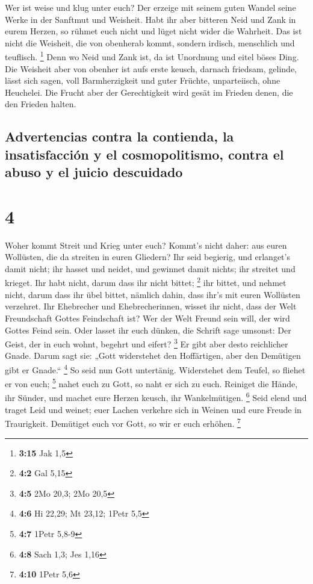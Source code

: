  Wer ist weise und klug unter euch? Der erzeige mit
seinem guten Wandel seine Werke in der Sanftmut und Weisheit.
 Habt ihr aber bitteren Neid und Zank in eurem Herzen, so
rühmet euch nicht und lüget nicht wider die Wahrheit. 
Das ist nicht die Weisheit, die von obenherab kommt, sondern irdisch,
menschlich und teuflisch. \footnote{\textbf{3:15} Jak 1,5}
 Denn wo Neid und Zank ist, da ist Unordnung und eitel
böses Ding.  Die Weisheit aber von obenher ist aufs erste
keusch, darnach friedsam, gelinde, lässt sich sagen, voll Barmherzigkeit
und guter Früchte, unparteiisch, ohne Heuchelei.  Die
Frucht aber der Gerechtigkeit wird gesät im Frieden denen, die den
Frieden halten.

\hypertarget{advertencias-contra-la-contienda-la-insatisfacciuxf3n-y-el-cosmopolitismo-contra-el-abuso-y-el-juicio-descuidado}{%
\subsection{Advertencias contra la contienda, la insatisfacción y el
cosmopolitismo, contra el abuso y el juicio
descuidado}\label{advertencias-contra-la-contienda-la-insatisfacciuxf3n-y-el-cosmopolitismo-contra-el-abuso-y-el-juicio-descuidado}}

\hypertarget{section-3}{%
\section{4}\label{section-3}}

 Woher kommt Streit und Krieg unter euch? Kommt's nicht
daher: aus euren Wollüsten, die da streiten in euren Gliedern?
 Ihr seid begierig, und erlanget's damit nicht; ihr hasset
und neidet, und gewinnet damit nichts; ihr streitet und krieget. Ihr
habt nicht, darum dass ihr nicht bittet; \footnote{\textbf{4:2} Gal 5,15}
 ihr bittet, und nehmet nicht, darum dass ihr übel bittet,
nämlich dahin, dass ihr's mit euren Wollüsten verzehret. 
Ihr Ehebrecher und Ehebrecherinnen, wisset ihr nicht, dass der Welt
Freundschaft Gottes Feindschaft ist? Wer der Welt Freund sein will, der
wird Gottes Feind sein.  Oder lasset ihr euch dünken, die
Schrift sage umsonst: Der Geist, der in euch wohnt, begehrt und eifert?
\footnote{\textbf{4:5} 2Mo 20,3; 2Mo 20,5}  Er gibt aber
desto reichlicher Gnade. Darum sagt sie: „Gott widerstehet den
Hoffärtigen, aber den Demütigen gibt er Gnade.`` \footnote{\textbf{4:6}
  Hi 22,29; Mt 23,12; 1Petr 5,5}  So seid nun Gott
untertänig. Widerstehet dem Teufel, so fliehet er von euch; \footnote{\textbf{4:7}
  1Petr 5,8-9}  nahet euch zu Gott, so naht er sich zu
euch. Reiniget die Hände, ihr Sünder, und machet eure Herzen keusch, ihr
Wankelmütigen. \footnote{\textbf{4:8} Sach 1,3; Jes 1,16} 
Seid elend und traget Leid und weinet; euer Lachen verkehre sich in
Weinen und eure Freude in Traurigkeit.  Demütiget euch
vor Gott, so wir er euch erhöhen. \footnote{\textbf{4:10} 1Petr 5,6}

